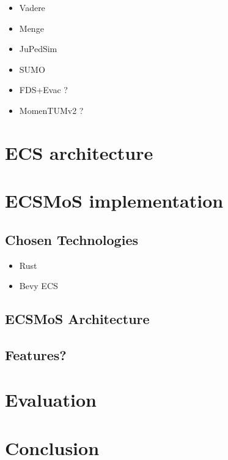 \documentclass[twoside, 11pt]{article}
\begin{document}
\begin{itemize}
  \item Vadere
  \item Menge
  \item JuPedSim
  \item SUMO
  \item FDS+Evac ?
  \item MomenTUMv2 ?
\end{itemize}

\section{ECS architecture}

\section{ECSMoS implementation}

\subsection{Chosen Technologies}

\begin{itemize}
  \item Rust
  \item Bevy ECS
\end{itemize}

\subsection{ECSMoS Architecture}
\subsection{Features?}

\section{Evaluation}
\section{Conclusion}
\end{document}
